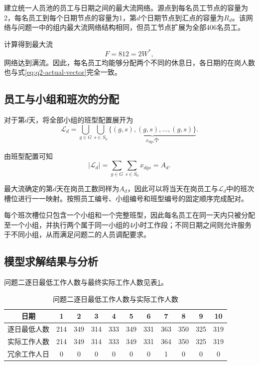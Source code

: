 \documentclass[withoutpreface,bwprint]{cumcmthesis}
\begin{document}
建立统一人员池的员工与日期之间的最大流网络。源点到每名员工节点的容量为2，每名员工到每个日期节点的容量为1，第$d$个日期节点到汇点的容量为$R_d$。该网络与问题一中的组内最大流网络结构相同，但员工节点扩展为全部406名员工。

计算得到最大流
\begin{equation}
F=812=2W^*,
\label{eq:q2-full-flow}
\end{equation}
网络达到满流。因此，每名员工均能够分配两个不同的休息日，各日期的在岗人数也与式\eqref{eq:q2-actual-vector}完全一致。

\subsection{员工与小组和班次的分配}

对于第$d$天，将全部小组的班型配置展开为
\begin{equation}
\mathcal L_d
=
\bigcup_{g\in G}
\bigcup_{s\in S_0}
\underbrace{\{(g,s),(g,s),\ldots,(g,s)\}}
_{x_{dgs}\text{个}}.
\label{eq:q2-slot-set}
\end{equation}

由班型配置可知
\begin{equation}
|\mathcal L_d|
=
\sum_{g\in G}\sum_{s\in S_0}x_{dgs}
=
A_d.
\label{eq:q2-slot-count}
\end{equation}

最大流确定的第$d$天在岗员工数同样为$A_d$，因此可以将当天在岗员工与$\mathcal L_d$中的班次槽位进行一一映射。按照员工编号、小组编号和班型编号的固定顺序完成配对。

每个班次槽位只包含一个小组和一个完整班型，因此每名员工在同一天内只被分配至一个小组，并执行两个属于同一小组的4小时工作段；不同日期之间则允许服务于不同小组，从而满足问题二的人员调配要求。

\subsection{模型求解结果与分析}

问题二逐日最低工作人数与最终实际工作人数见表\ref{tab:q2-daily-result}。

\begin{table}[H]
\centering
\caption{问题二逐日最低工作人数与实际工作人数}
\label{tab:q2-daily-result}
\begin{tabular}{c*{10}{c}}
\toprule
日期 &1&2&3&4&5&6&7&8&9&10\\
\midrule
逐日最低人数
&214&349&314&333&349&331&363&350&325&319\\
实际工作人数
&214&349&314&333&349&331&364&350&325&319\\
冗余工作人日
&0&0&0&0&0&0&1&0&0&0\\
\bottomrule
\end{tabular}
\end{table}
\end{document}
